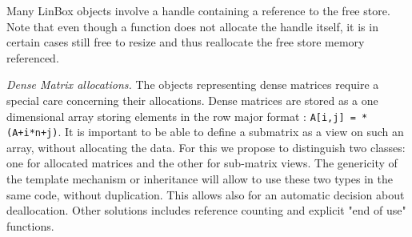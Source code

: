 \documentclass[runningheads,a4paper]{llncs}
\begin{document}
Many LinBox objects involve a handle containing a reference to the free store.
Note that even though a function does not allocate the handle itself,
it is in certain cases still free to resize and thus reallocate the free store memory referenced.


{\em Dense Matrix allocations.}
The objects representing dense matrices require a special care
concerning  their allocations. Dense matrices are stored as a one
dimensional array storing elements in the row major format :
\texttt{A[i,j] = *(A+i*n+j)}.  It is important to be 
able to define a submatrix as a view on such an array, without
allocating the data.
For this we propose to distinguish two classes: one for allocated
matrices and the other for sub-matrix views. The 
genericity of  the template mechanism or inheritance will allow to use
these two types in the same code, without duplication. This allows
also for an automatic decision about deallocation.
Other solutions includes reference counting and explicit "end of use"
functions.



\end{document}

